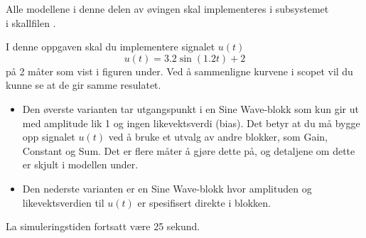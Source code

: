 
\item[]   Alle modellene i denne delen av øvingen skal implementeres
  i subsystemet\\
   i 
  skallfilen .



\item
  I denne oppgaven skal du implementere signalet $u(t)$
  \begin{equation}
    \label{eq:208}
    u(t) = 3.2\sin(1.2t)+2
  \end{equation}
  på 2 måter som vist i figuren under. Ved å sammenligne kurvene i
  scopet vil du kunne se at de gir samme resulatet.
  \begin{figure}[H]
    \centering
    \hspace*{0mm}
  \end{figure}

  \begin{itemize}
  \item 
  Den øverste varianten tar utgangspunkt i en 
  {\sf  Sine Wave}-blokk som kun gir ut
   med amplitude lik 1 og ingen likevektsverdi (bias).
  Det betyr at du må bygge opp signalet $u(t)$ ved å bruke et utvalg
  av andre blokker, som {\sf  Gain}, {\sf  Constant} og {\sf 
    Sum}. Det er flere måter å gjøre dette på, og detaljene om dette
  er skjult i modellen under. 

\item  Den nederste varianten er  en  {\sf  Sine Wave}-blokk hvor
  amplituden og likevektsverdien til $u(t)$ er spesifisert direkte i blokken.
  \end{itemize}

  {\color{red}La simuleringstiden fortsatt være 25 sekund.  }

